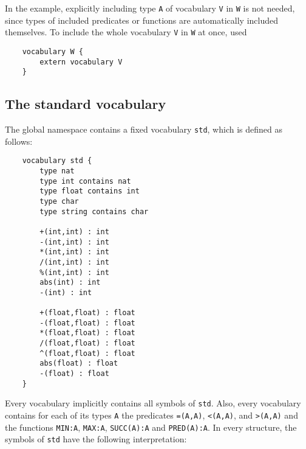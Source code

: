 \documentclass[a4]{article}
\newcommand{\code}[1]{{\tt #1}}
\begin{document}
In the example, explicitly including type \code{A} of vocabulary \code{V} in \code{W} is not needed, since types of included predicates or functions are automatically included themselves.  To include the whole vocabulary \code{V} in \code{W} at once, used
\begin{lstlisting}
	vocabulary W {
		extern vocabulary V
	}
\end{lstlisting}




\subsection{The standard vocabulary}

The global namespace contains a fixed vocabulary \code{std}, which is defined as follows:

\begin{lstlisting}
	vocabulary std {
		type nat	
		type int contains nat
		type float contains int
		type char
		type string contains char

		+(int,int) : int
		-(int,int) : int
		*(int,int) : int
		/(int,int) : int
		%(int,int) : int
		abs(int) : int
		-(int) : int
		
		+(float,float) : float
		-(float,float) : float
		*(float,float) : float
		/(float,float) : float
		^(float,float) : float
		abs(float) : float
		-(float) : float
	}
\end{lstlisting}
Every vocabulary implicitly contains all symbols of \code{std}.  Also, every vocabulary contains for each of its types \code{A} the predicates \code{=(A,A)}, \code{<(A,A)}, and \code{>(A,A)} and the functions \code{MIN:A}, \code{MAX:A}, \code{SUCC(A):A} and \code{PRED(A):A}. In every structure, the symbols of \code{std} have the following interpretation:
\end{document}
